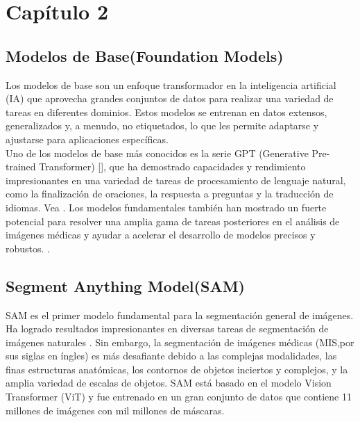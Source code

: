 \documentclass[12pt]{article}
\begin{document}
		
	
	
	\newpage
	
	\section{Cap\'itulo 2}
	
		\subsection{Modelos de Base(Foundation Models)}
		Los modelos de base son un enfoque transformador en la inteligencia artificial (IA) que aprovecha grandes conjuntos de datos para realizar una variedad de tareas en diferentes dominios. Estos modelos se entrenan en datos extensos, generalizados y, a menudo, no etiquetados, lo que les permite adaptarse y ajustarse para aplicaciones específicas. 
		\\
		Uno de los modelos de base más conocidos es la serie GPT (Generative Pre-trained Transformer) [\cite{Brown2020LanguageModels,OpenAI2023GPT4}], que ha demostrado capacidades y rendimiento impresionantes en una variedad de tareas de procesamiento de lenguaje natural, como la finalización de oraciones, la respuesta a preguntas y la traducción de idiomas. Vea \cite{Zhang2024SegmentAnything}.
		Los modelos fundamentales también han mostrado un fuerte potencial para resolver una amplia gama de tareas posteriores en el análisis de imágenes médicas y ayudar a acelerar el desarrollo de modelos precisos y robustos. \cite{Zhang2024SegmentAnything}.
		
		\subsection{Segment Anything Model(SAM)}
		SAM es el primer modelo fundamental para la segmentación general de imágenes. Ha logrado resultados impresionantes en diversas tareas de segmentación de imágenes naturales \parencite{Huang2024}. Sin embargo, la segmentación de imágenes médicas (MIS,por sus siglas en \'ingles) es más desafiante debido a las complejas modalidades, las finas estructuras anatómicas, los contornos de objetos inciertos y complejos, y la amplia variedad de escalas de objetos. SAM est\'a basado en el modelo Vision Transformer (ViT) y fue entrenado en un gran conjunto de datos que contiene 11 millones de imágenes con  mil millones de máscaras.
		\\
		
\end{document}
